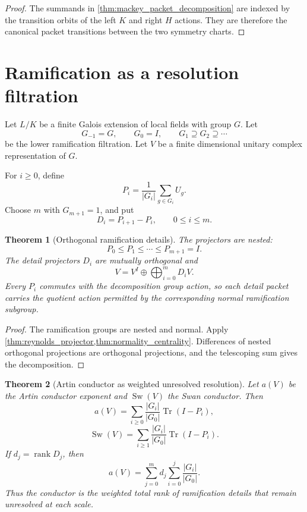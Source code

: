 \documentclass{aomart}
\newtheorem{theorem}{Theorem}[section]
\theoremstyle{definition}
\theoremstyle{remark}
\newcommand{\Tr}{\operatorname{Tr}}
\begin{document}
\begin{proof}
The summands in \cref{thm:mackey_packet_decomposition} are indexed by the transition orbits of the left \(K\) and right \(H\) actions. They are therefore the canonical packet transitions between the two symmetry charts.
\end{proof}

\section{Ramification as a resolution filtration}\label{sec:ramification_resolution}

Let \(L/K\) be a finite Galois extension of local fields with group \(G\). Let
\[
 G_{-1}=G,
 \qquad
 G_0=I,
 \qquad
 G_1\supseteq G_2\supseteq\cdots
\]
be the lower ramification filtration. Let \(V\) be a finite dimensional unitary complex representation of \(G\).

\begin{definition}\label{def:ramification_resolution}
For \(i\geq0\), define
\[
 P_i
 =
 \frac1{|G_i|}\sum_{g\in G_i}U_g.
\]
Choose \(m\) with \(G_{m+1}=1\), and put
\[
 D_i=P_{i+1}-P_i,
 \qquad
 0\leq i\leq m.
\]
\end{definition}

\begin{theorem}[Orthogonal ramification details]\label{thm:ramification_details}
The projectors are nested:
\[
 P_0\leq P_1\leq\cdots\leq P_{m+1}=I.
\]
The detail projectors \(D_i\) are mutually orthogonal and
\[
 \boxed{
 V
 =
 V^{I}
 \mathbin\oplus
 \bigoplus_{i=0}^{m}D_iV.
 }
\]
Every \(P_i\) commutes with the decomposition group action, so each detail packet carries the quotient action permitted by the corresponding normal ramification subgroup.
\end{theorem}

\begin{proof}
The ramification groups are nested and normal. Apply \cref{thm:reynolds_projector,thm:normality_centrality}. Differences of nested orthogonal projections are orthogonal projections, and the telescoping sum gives the decomposition.
\end{proof}

\begin{theorem}[Artin conductor as weighted unresolved resolution]\label{thm:artin_conductor_resolution}
Let \(a(V)\) be the Artin conductor exponent and \(\operatorname{Sw}(V)\) the Swan conductor. Then
\[
 \boxed{
 a(V)
 =
 \sum_{i\geq0}
 \frac{|G_i|}{|G_0|}
 \Tr(I-P_i),
 }
\]
\[
 \boxed{
 \operatorname{Sw}(V)
 =
 \sum_{i\geq1}
 \frac{|G_i|}{|G_0|}
 \Tr(I-P_i).
 }
\]
If \(d_j=\operatorname{rank}D_j\), then
\[
 \boxed{
 a(V)
 =
 \sum_{j=0}^{m}
 d_j
 \sum_{i=0}^{j}
 \frac{|G_i|}{|G_0|}.
 }
\]
Thus the conductor is the weighted total rank of ramification details that remain unresolved at each scale.
\end{theorem}
\end{document}
